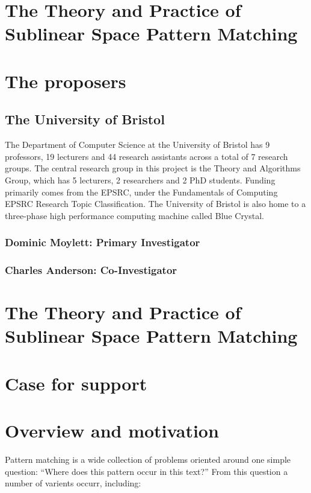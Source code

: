 \documentclass[a4paper,11pt]{article}
\begin{document}
    \section*{The Theory and Practice of Sublinear Space Pattern Matching}

    \section*{The proposers}

    \subsection*{The University of Bristol}

    The Department of Computer Science at the University of Bristol has 9 professors, 19 lecturers and 44 research assistants across a total of 7 research groups. The central research group in this project is the Theory and Algorithms Group, which has 5 lecturers, 2 researchers and 2 PhD students. Funding primarily comes from the EPSRC, under the Fundamentals of Computing EPSRC Research Topic Classification. The University of Bristol is also home to a three-phase high performance computing machine called Blue Crystal.

    \subsubsection*{Dominic Moylett: Primary Investigator}

    \subsubsection*{Charles Anderson: Co-Investigator}

    \newpage
    \section*{The Theory and Practice of Sublinear Space Pattern Matching}
    \section*{Case for support}

    \section{Overview and motivation}

    Pattern matching is a wide collection of problems oriented around one simple question: ``Where does this pattern occur in this text?'' From this question a number of varients occurr, including:
\end{document}
